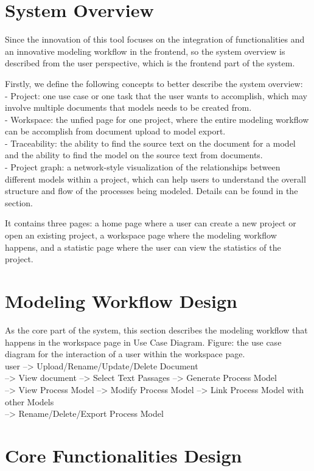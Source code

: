 \section{System Overview}
Since the innovation of this tool focuses on the integration of functionalities and an innovative modeling workflow in the frontend, so the system overview is described from the user perspective, which is the frontend part of the system.

Firstly, we define the following concepts to better describe the system overview:\\
- Project: one use case or one task that the user wants to accomplish, which may involve multiple documents that models needs to be created from. \\
- Workspace: the unfied page for one project, where the entire modeling workflow can be accomplish from document upload to model export.\\
- Traceability: the ability to find the source text on the document for a model and the ability to find the model on the source text from documents.\\
- Project graph: a network-style visualization of the relationships between different models within a project, which can help users to understand the overall structure and flow of the processes being modeled. Details can be found in the section.

It contains three pages: a home page where a user can create a new project or open an existing project, a workspace page where the modeling workflow happens, and a statistic page where the user can view the statistics of the project. 
\section{Modeling Workflow Design}
As the core part of the system, this section describes the modeling workflow that happens in the workspace page in Use Case Diagram.
Figure: the use case diagram for the interaction of a user within the workspace page.\\
user --> Upload/Rename/Update/Delete Document\\
     --> View document --> Select Text Passages --> Generate Process Model\\
     --> View Process Model --> Modify Process Model --> Link Process Model with other Models\\
     --> Rename/Delete/Export Process Model
\section{Core Functionalities Design}
